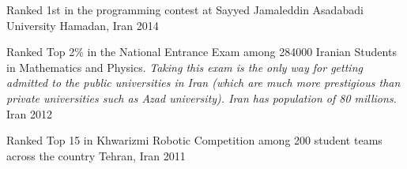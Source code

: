 \begin{cvhonors}
  \cvhonor
    {Ranked 1st} %
    {in the programming contest at Sayyed Jamaleddin Asadabadi University} %
    {Hamadan, Iran} %
    {2014} %

  \cvhonor
    {Ranked Top 2\%} %
    {in the National Entrance Exam among 284000 Iranian Students in Mathematics and Physics. \textit{Taking this exam is the only way for getting admitted to the public universities in Iran (which are much more prestigious than private universities such as Azad university). Iran has population of 80 millions.}} %
    {Iran} %
    {2012} %

  \cvhonor
    {Ranked Top 15}
    {in Khwarizmi Robotic Competition among 200 student teams across the country}
    {Tehran, Iran}
    {2011}
    

\end{cvhonors}

